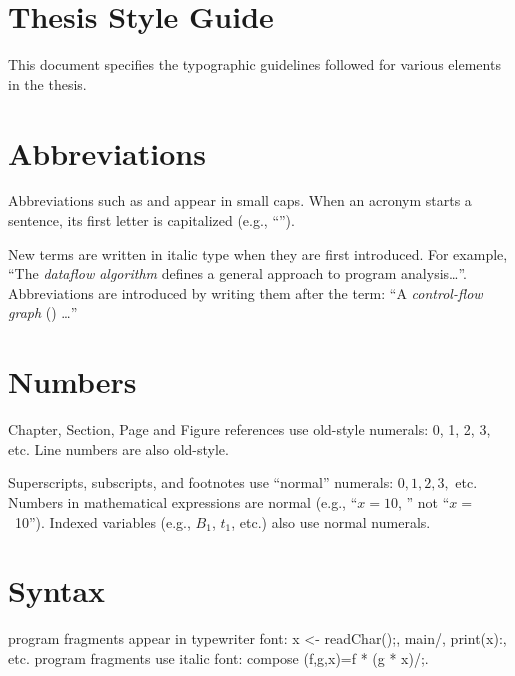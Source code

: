 \dodocclass

\fancyhf{}
\numbersoff


\section{Thesis Style Guide}

This document specifies the typographic guidelines followed for various
elements in the thesis. 

\section*{Abbreviations}
Abbreviations such as \mil and \cfg appear in small caps. When an
acronym starts a sentence, its first letter is capitalized (e.g.,
``\Mil'').

New terms are written in italic type when they are first
introduced. For example, ``The \emph{dataflow algorithm} defines a
general approach to program analysis\dots''. Abbreviations
are introduced by writing them after the term: ``A \emph{control-flow graph}
(\cfg) \dots''

\section*{Numbers}
Chapter, Section, Page and Figure references use old-style numerals:
0, 1, 2, 3, etc.  Line numbers are also old-style.

Superscripts, subscripts, and footnotes use ``normal'' numerals: $0,
1, 2, 3,$ etc.  Numbers in mathematical expressions are normal (e.g.,
``$x = 10$, '' not ``$x = $\ 10'').  Indexed variables (e.g., $B_1$,
$t_1$, etc.) also use normal numerals.

\section*{Syntax}
\Mil program fragments appear in typewriter font: \binds x <- \goto readChar();,
\lab main/, \block print(x):, etc. \lamC program fragments use italic
font: \lcdef compose (f,g,x)=\lcapp f * (g * x)/;.


